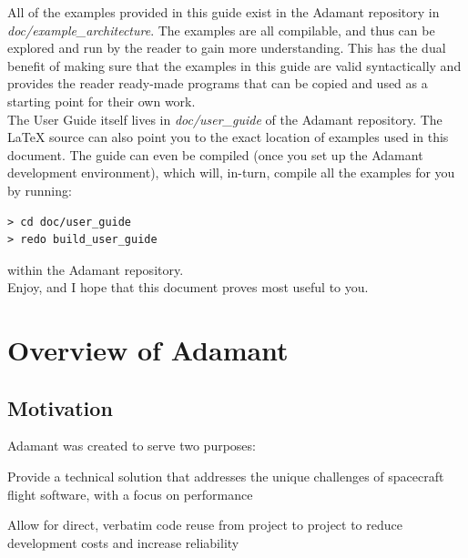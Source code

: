 All of the examples provided in this guide exist in the Adamant repository in \textit{doc/example\_architecture}. The examples are all compilable, and thus can be explored and run by the reader to gain more understanding. This has the dual benefit of making sure that the examples in this guide are valid syntactically and provides the reader ready-made programs that can be copied and used as a starting point for their own work. \\

The User Guide itself lives in \textit{doc/user\_guide} of the Adamant repository. The \LaTeX{} source can also point you to the exact location of examples used in this document. The guide can even be compiled (once you set up the Adamant development environment), which will, in-turn, compile all the examples for you by running:

\vspace{5mm} %
\begin{verbatim}
> cd doc/user_guide
> redo build_user_guide
\end{verbatim}
\vspace{5mm} %

within the Adamant repository. \\

Enjoy, and I hope that this document proves most useful to you.

\newpage
\section{Overview of Adamant}

\subsection{Motivation}

Adamant was created to serve two purposes: 

\vspace{1mm} %
\begin{spacedenumerate}
  \item Provide a technical solution that addresses the unique challenges of spacecraft flight software, with a focus on performance
  \item Allow for direct, verbatim code reuse from project to project to reduce development costs and increase reliability
\end{spacedenumerate}
\vspace{1mm} %

